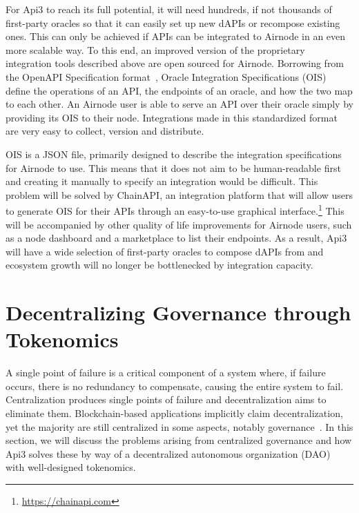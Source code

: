 \documentclass[11pt]{article}
\begin{document}
For Api3 to reach its full potential, it will need hundreds, if not thousands of first-party oracles so that it can easily set up new dAPIs or recompose existing ones.
This can only be achieved if APIs can be integrated to Airnode in an even more scalable way.
To this end, an improved version of the proprietary integration tools described above are open sourced for Airnode.
Borrowing from the OpenAPI Specification format~\cite{oas}, Oracle Integration Specifications (OIS) define the operations of an API, the endpoints of an oracle, and how the two map to each other.
An Airnode user is able to serve an API over their oracle simply by providing its OIS to their node.
Integrations made in this standardized format are very easy to collect, version and distribute.

OIS is a JSON file, primarily designed to describe the integration specifications for Airnode to use.
This means that it does not aim to be human-readable first and creating it manually to specify an integration would be difficult.
This problem will be solved by ChainAPI, an integration platform that will allow users to generate OIS for their APIs through an easy-to-use graphical interface.\footnote{\url{https://chainapi.com}}
This will be accompanied by other quality of life improvements for Airnode users, such as a node dashboard and a marketplace to list their endpoints.
As a result, Api3 will have a wide selection of first-party oracles to compose dAPIs from and ecosystem growth will no longer be bottlenecked by integration capacity.

\section{Decentralizing Governance through Tokenomics}
\label{sec:decentralizing-governance-through-tokenomics}

A single point of failure is a critical component of a system where, if failure occurs, there is no redundancy to compensate, causing the entire system to fail.
Centralization produces single points of failure and decentralization aims to eliminate them.
Blockchain-based applications implicitly claim decentralization, yet the majority are still centralized in some aspects, notably governance~\cite{Walch:2019}.
In this section, we will discuss the problems arising from centralized governance and how Api3 solves these by way of a decentralized autonomous organization (DAO)~\cite{buterin:2014b} with well-designed tokenomics.
\end{document}
